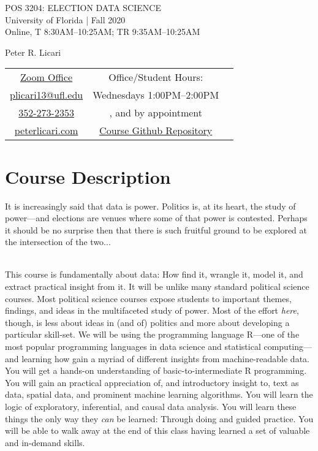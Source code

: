 \documentclass[11pt]{article}
\begin{document}
\begin{center}
{\Huge POS 3204: ELECTION DATA SCIENCE}\\\vspace{1mm}
{\Large University of Florida | Fall 2020}\\\vspace{1mm}
{\Large Online, T 8:30AM--10:25AM; TR 9:35AM--10:25AM}
\end{center}
\bigskip
\begin{center}
{\LARGE Peter R. Licari}\\\vspace{5mm}
\setlength{\tabcolsep}{20pt}
\begin{tabular}{ c c c}
  {\href{https://ufl.zoom.us/j/8174990226}{Zoom Office}} & Office/Student Hours:\\
    {\href{mailto:plicari13@ufl.edu}{plicari13@ufl.edu}} & Wednesdays 1:00PM--2:00PM \\
  {\href{tel:3522732353}{352-273-2353}} & , and by appointment \\
  {\href{https://www.peterlicari.com}{peterlicari.com}} & \href{https://github.com/prlitics/Election-Data-Science-Fall-2020}{Course Github Repository}
\end{tabular}
\end{center}

\section{Course Description} 

It is increasingly said that data is power. Politics is, at its heart, the study of power---and elections are venues where some of that power is contested. Perhaps it should be no surprise then that there is such fruitful ground to be explored at the intersection of the two...
\\\

This course is fundamentally about data: How find it, wrangle it, model it, and extract practical insight from it. It will be unlike many standard political science courses. Most political science courses expose students to important themes, findings, and ideas in the multifaceted study of power. Most of the effort \textit{here}, though, is less about ideas in (and of) politics and more about developing a particular skill-set. We will be using the programming language R---one of the most popular programming languages in data science and statistical computing---and learning how gain a myriad of different insights from machine-readable data. You will get a hands-on understanding of basic-to-intermediate R programming. You will gain an practical appreciation of, and introductory insight to, text as data, spatial data, and prominent machine learning algorithms. You will learn the logic of exploratory, inferential, and causal data analysis. You will learn these things the only way they \textit{can} be learned: Through doing and guided practice. You will be able to walk away at the end of this class having learned a set of valuable and in-demand skills.
\\\
\end{document}
